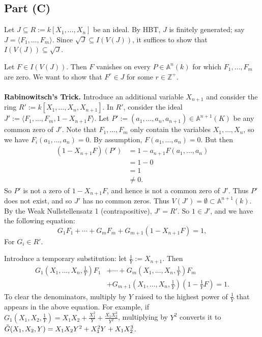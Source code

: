 \documentclass[12pt]{article}
\newcommand{\z}{\mathbb{Z}}
\newcommand{\vbrack}[1]{\langle #1\rangle}
\theoremstyle{definition}
\begin{document}
\subsection{Part (C)}
Let $J\subseteq R:=k[X_1,\dotsc,X_n]$ be an ideal. By HBT, $J$ is finitely generated; say $J=\vbrack{F_1,\dotsc,F_m}$. Since $\sqrt{J}\subseteq I(V(J))$, it suffices to show that $I(V(J))\subseteq\sqrt{J}$. 

Let $F\in I(V(J))$. Then $F$ vanishes on every $P\in\mathbb{A}^n(k)$ for which $F_1,\dotsc,F_m$ are zero. We want to show that $F^r\in J$ for some $r\in\z^+$.\\\\
\textbf{Rabinowitsch's Trick.} Introduce an additional variable $X_{n+1}$ and consider the ring $R':=k[X_1,\dotsc,X_n,X_{n+1}]$. In $R'$, consider the ideal $J':=\vbrack{F_1,\dotsc,F_m,1-X_{n+1}F}$. Let $P':=(a_1,\dotsc,a_n,a_{n+1})\in\mathbb{A}^{n+1}(K)$ be any common zero of $J'$. Note that $F_1,\dotsc,F_m$ only contain the variables $X_1,\dotsc,X_n$, so we have $F_i(a_1,\dotsc,a_n)=0$. By assumption, $F(a_1,\dotsc,a_n)=0$. But then 
\begin{align*}
    (1-X_{n+1}F)(P')&=1-a_{n+1}F(a_1,\dotsc,a_n)\\
    &=1-0\\
    &=1\\
    &\neq0.
\end{align*}
So $P'$ is not a zero of $1-X_{n+1}F$, and hence is not a common zero of $J'$. Thus $P'$ does not exist, and so $J'$ has no common zeros. Thus $V(J')=\emptyset\subset\mathbb{A}^{n+1}(k)$. By the Weak Nullstellensatz 1 (contrapositive), $J'=R'$. So $1\in J'$, and we have the following equation:
\[G_1F_1+\dotsb+G_mF_m+G_{m+1}(1-X_{n+1}F)=1,\]
For $G_i\in R'$.

Introduce a temporary substitution: let $\frac{1}{Y}:=X_{n+1}$. Then
\begin{align*}
    G_1\left(X_1,\dotsc,X_n,\frac{1}{Y}\right)F_1&+\dotsb+G_m\left(X_1,\dotsc,X_n,\frac{1}{Y}\right)F_m\\
    &+G_{m+1}\left(X_1,\dotsc,X_n,\frac{1}{Y}\right)\left(1-\frac{1}{Y}F\right)=1.
\end{align*}
To clear the denominators, multiply by $Y$ raised to the highest power of $\frac{1}{Y}$ that appears in the above equation. For example, if $G_1\left(X_1,X_2,\frac{1}{Y}\right)=X_1X_2+\frac{X_1^2}{Y}+\frac{X_1X_2^3}{Y^2}$, multiplying by $Y^2$ converts it to $\Tilde{G}(X_1,X_2,Y)=X_1X_2Y^2+X_1^2Y+X_1X_2^3$.
\end{document}

